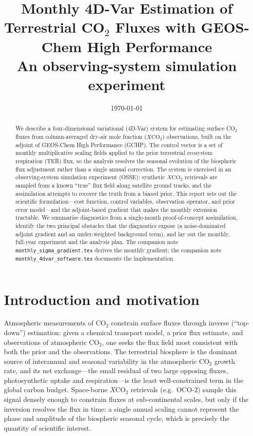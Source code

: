 \documentclass[12pt]{article}
\title{\textbf{Monthly 4D-Var Estimation of Terrestrial CO$_2$ Fluxes
with GEOS-Chem High Performance}\\
\large An observing-system simulation experiment}
\author{}
\date{\today}
\newcommand{\xco}{X\mathrm{CO}_2}
\newcommand{\co}{\mathrm{CO}_2}
\begin{document}
\maketitle

\begin{abstract}
We describe a four-dimensional variational (4D-Var) system for estimating
surface CO$_2$ fluxes from column-averaged dry-air mole fraction ($\xco$)
observations, built on the adjoint of GEOS-Chem High Performance (GCHP). The
control vector is a set of monthly multiplicative scaling fields applied to the
prior terrestrial ecosystem respiration (TER) flux, so the analysis resolves the
seasonal evolution of the biospheric flux adjustment rather than a single
annual correction. The system is exercised in an observing-system simulation
experiment (OSSE): synthetic $\xco$ retrievals are sampled from a known ``true''
flux field along satellite ground tracks, and the assimilation attempts to
recover the truth from a biased prior. This report sets out the scientific
formulation---cost function, control variables, observation operator, and prior
error model---and the adjoint-based gradient that makes the monthly extension
tractable. We summarise diagnostics from a single-month proof-of-concept
assimilation, identify the two principal obstacles that the diagnostics expose
(a noise-dominated adjoint gradient and an under-weighted background term), and
lay out the monthly, full-year experiment and the analysis plan. The companion
note \texttt{monthly\_sigma\_gradient.tex} derives the monthly gradient; the
companion note \texttt{monthly\_4dvar\_software.tex} documents the
implementation.
\end{abstract}

\tableofcontents

\section{Introduction and motivation}

Atmospheric measurements of $\co$ constrain surface fluxes through inverse
(``top-down'') estimation: given a chemical transport model, a prior flux
estimate, and observations of atmospheric $\co$, one seeks the flux field most
consistent with both the prior and the observations. The terrestrial biosphere
is the dominant source of interannual and seasonal variability in the
atmospheric $\co$ growth rate, and its net exchange---the small residual of two
large opposing fluxes, photosynthetic uptake and respiration---is the least
well-constrained term in the global carbon budget. Space-borne $\xco$
retrievals (e.g.\ OCO-2) sample this signal densely enough to constrain fluxes
at sub-continental scales, but only if the inversion resolves the flux in time:
a single annual scaling cannot represent the phase and amplitude of the
biospheric seasonal cycle, which is precisely the quantity of scientific
interest.
\end{document}
